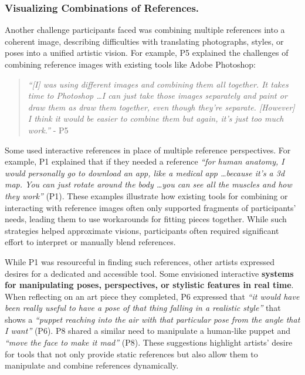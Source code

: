 \subsubsection{Visualizing Combinations of References.} \label{visualize}
Another challenge participants faced was combining multiple references into a coherent image, describing difficulties with translating photographs, styles, or poses into a unified artistic vision. For example, P5 explained the challenges of combining reference images with existing tools like Adobe Photoshop:
\begin{quote}
    \textit{``[I] was using different images and combining them all together. It takes time to Photoshop \dots I can just take those images separately and paint or draw them as draw them together, even though they're separate. [However] I think it would be easier to combine them but again, it's just too much work.''} - P5
\end{quote}

Some used interactive references in place of multiple reference perspectives. For example, P1 explained that if they needed a reference \textit{``for human anatomy, I would personally go to download an app, like a medical app \dots because it's a 3d map. You can just rotate around the body \dots you can see all the muscles and how they work''} (P1). These examples illustrate how existing tools for combining or interacting with reference images often only supported fragments of participants' needs, leading them to use workarounds for fitting pieces together. While such strategies helped approximate visions, participants often required significant effort to interpret or manually blend references.

While P1 was resourceful in finding such references, other artists expressed desires for a dedicated and accessible tool. Some envisioned interactive \textbf{systems for manipulating poses, perspectives, or stylistic features in real time}. When reflecting on an art piece they completed, P6 expressed that \textit{``it would have been really useful to have a pose of that thing falling in a realistic style''} that shows a \textit{``puppet reaching into the air with that particular pose from the angle that I want''} (P6). P8 shared a similar need to manipulate a human-like puppet and \textit{``move the face to make it mad''} (P8). 
These suggestions highlight artists' desire for tools that not only provide static references but also allow them to manipulate and combine references dynamically.



